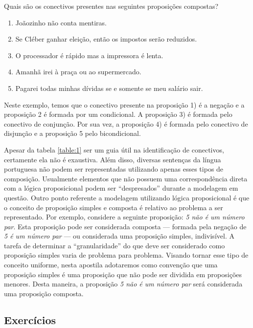 \begin{Example}
  Quais s\~ao os conectivos presentes nas seguintes proposi\c{c}\~oes compostas?
    \begin{enumerate}
    \item Jo\~aozinho n\~ao conta mentiras.
    \item Se Cl\'eber ganhar elei\c{c}\~ao, ent\~ao os impostos ser\~ao reduzidos.
    \item O processador \'e r\'apido mas a impressora \'e lenta.
    \item Amanh\~a irei \`a pra\c{c}a ou ao supermercado.
    \item Pagarei todas minhas d\'ividas se e somente se meu sal\'ario sair.
  \end{enumerate}
  Neste exemplo, temos que o conectivo presente na proposi\c{c}\~ao 1) \'e a nega\c{c}\~ao e a proposi\c{c}\~ao 2 \'e formada por um condicional.
  A proposi\c{c}\~ao 3) \'e formada pelo conectivo de conjun\c{c}\~ao. Por sua vez, a proposi\c{c}\~ao 4) \'e formada pelo conectivo
  de disjun\c{c}\~ao e a proposi\c{c}\~ao 5 pelo bicondicional.
\end{Example}

Apesar da tabela \ref{table:1} ser um guia \'util na identifica\c{c}\~ao de conectivos, certamente ela n\~ao \'e exaustiva. Al\'em disso,
diversas senten\c{c}as da l\'ingua portuguesa n\~ao podem ser representadas utilizando apenas esses tipos de composi\c{c}\~ao. Usualmente
elementos que n\~ao possuem uma correspond\^encia direta com a l\'ogica proposicional podem ser ``despresados'' durante a modelagem em
quest\~ao. Outro ponto referente a modelagem utilizando l\'ogica proposicional \'e que o conceito de proposi\c{c}\~ao simples e composta
\'e relativo ao problema a ser representado. Por exemplo, considere a seguinte proposi\c{c}\~ao: \textit{5 n\~ao \'e um n\'umero par}. Esta
proposi\c{c}\~ao pode ser considerada composta --- formada pela nega\c{c}\~ao de \textit{5 \'e um n\'umero par} --- ou considerada uma
proposi\c{c}\~ao simples, indivis\'ivel. A tarefa de determinar a ``granularidade'' do que deve ser considerado como proposi\c{c}\~ao
simples varia de problema para problema. Visando tornar esse tipo de conceito uniforme, nesta apostila adotaremos como conven\c{c}\~ao que
uma proposi\c{c}\~ao simples \'e uma proposi\c{c}\~ao que n\~ao pode ser dividida em proposi\c{c}\~oes menores. Desta maneira, a proposi\c{c}\~ao
\textit{5 n\~ao \'e um n\'umero par} ser\'a considerada uma proposi\c{c}\~ao composta.

\subsection{Exerc\'icios}\label{cap1:ex1}

